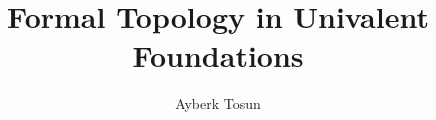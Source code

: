

\usepackage{ebproof}

\title{Formal Topology in Univalent Foundations}
\author{Ayberk Tosun}





\newcommand{\reals}{\mathbb{R}}
\newcommand{\nats}{\mathbb{N}}
\newcommand{\bool}{\mathbf{Bool}}
\newcommand{\ball}[2]{\mathfrak{A}(#1, #2)}
\newcommand{\neighbourhood}[1]{\mathbf{N}(#1)}

\newcommand{\pity}[3]{\prod_{(#1~:~#2)} #3}
\newcommand{\sigmaty}[3]{\sum_{(#1~:~#2)} #3}
\newcommand{\univ}{\mathcal{U}}
\newcommand{\isaprop}[1]{\mathsf{IsProp}\left(#1\right)}
\newcommand{\hprop}{\mathsf{hProp}}
\newcommand{\isaset}[1]{\mathsf{IsSet}\left(#1\right)}
\newcommand{\abs}[1]{\left| #1 \right|}
\newcommand{\trunc}[1]{\left\| #1 \right\|}
\newcommand{\pow}[1]{\mathcal{P}\left(#1\right)}
\newcommand{\sub}[2]{\mathsf{Fam}_{#1}\left(#2\right)}
\newcommand{\indexnm}{\mathsf{index}}
\newcommand{\indexset}[1]{\indexnm{}\left(#1\right)}
\newcommand{\pair}[2]{\langle #1 , #2 \rangle}

\newcommand{\isdcnm}{\mathsf{DownwardsClosed}}
\newcommand{\isdc}[1]{\isdcnm{}\left(#1\right)}
\newcommand{\dcsubsetnm}{\mathsf{DCSubset}}
\newcommand{\dcsubset}[1]{\dcsubsetnm{}\left(#1\right)}

\newcommand{\ordernm}{\mathsf{Order}}
\newcommand{\order}[2]{\ordernm{}_{#1}\left(#2\right)}

\newcommand{\posetstrnm}{\mathsf{PosetStr}}
\newcommand{\posetstr}[2]{\posetstrnm{}_{#1}\left(#2\right)}

\newcommand{\posetaxnm}{\mathsf{PosetAx}}
\newcommand{\posetax}[1]{\posetaxnm{}\left(#1\right)}

\newcommand{\poset}{\mathsf{Poset}}

\newcommand{\ismonotonicnm}{\mathsf{IsMonotonic}}
\newcommand{\ismonotonic}[1]{\ismonotonicnm{}\left(#1\right)}

\newcommand{\monotonicmapnm}{\rightarrow_m}
\newcommand{\monotonicmap}[2]{#1 \rightarrow_m #2}

\newcommand{\framestrnm}{\mathsf{FrameStr}}
\newcommand{\framestr}[1]{\framestrnm{}\left(#1\right)}
\newcommand{\frameax}[1]{\mathsf{FrameAx}\left(#1\right)}

